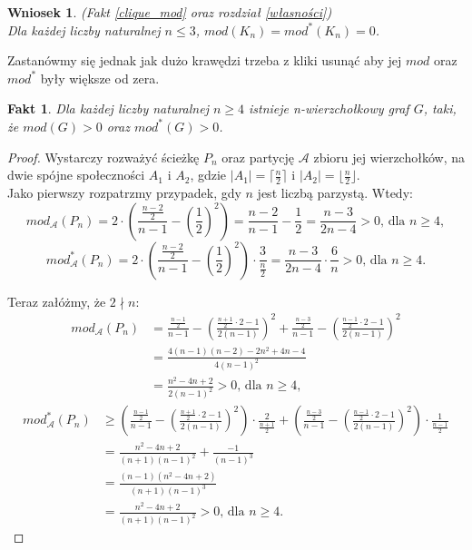 \documentclass[letterpaper,12pt]{article}
\newtheorem{fact}{Fakt}
\newtheorem{conclusion}{Wniosek}
\begin{document}
  \begin{conclusion}
    (Fakt \ref{clique_mod} oraz rozdział \ref{własności})\\
    Dla każdej liczby naturalnej \(n \leq 3\), \(mod(K_n) = mod^*(K_n) = 0\).\\
  \end{conclusion}

  Zastanówmy się jednak jak dużo krawędzi trzeba z kliki usunąć aby jej \(mod\) \cite{MS23} oraz \(mod^*\) były większe od zera.\\

  \begin{fact}
    Dla każdej liczby naturalnej \(n \geq 4\) istnieje n-wierzchołkowy graf \(G\), taki, że \(mod(G) > 0\) oraz \(mod^*(G) > 0\).\\
  \end{fact}
  \begin{proof}
    Wystarczy rozważyć ścieżkę \(P_n\) oraz partycję \(\mathcal{A}\) zbioru jej wierzchołków, na dwie spójne społeczności \(A_1\) i \(A_2\), gdzie \(|A_1| = \lceil\frac{n}{2}\rceil\) i \(|A_2| = \lfloor\frac{n}{2}\rfloor\).\\

    Jako pierwszy rozpatrzmy przypadek, gdy \(n\) jest liczbą parzystą. Wtedy:
    \[mod_{\mathcal{A}}(P_n) = 2\cdot\left(\frac{\frac{n-2}{2}}{n-1} - {\left(\frac{1}{2}\right)}^2\right) = \frac{n-2}{n-1}-\frac{1}{2}=\frac{n-3}{2n-4}>0 \text{, dla } n \geq 4,\]
    \[mod_{\mathcal{A}}^*(P_n) = 2\cdot\left(\frac{\frac{n-2}{2}}{n-1} - {\left(\frac{1}{2}\right)}^2\right) \cdot \frac{3}{\frac{n}{2}}=\frac{n-3}{2n-4} \cdot \frac{6}{n} > 0\text{, dla } n \geq 4.\]

    Teraz załóżmy, że \(2\nmid n\):
    \begin{align*}
      mod_{\mathcal{A}}(P_n) &= \frac{\frac{n-1}{2}}{n-1} - {\left(\frac{\frac{n+1}{2}\cdot 2-1}{2(n-1)}\right)}^2 + \frac{\frac{n-3}{2}}{n-1} - {\left(\frac{\frac{n-1}{2}\cdot 2-1}{2(n-1)}\right)}^2 \\
      &= \frac{4(n-1)(n-2)-2n^2+4n-4}{4(n-1)^2} \\
      &= \frac{n^2-4n+2}{2(n-1)^2}>0 \text{, dla } n \geq 4,
    \end{align*}
    \begin{align*}
      mod_{\mathcal{A}}^*(P_n) &\geq \left(\frac{\frac{n-1}{2}}{n-1} - {\left(\frac{\frac{n+1}{2}\cdot 2-1}{2(n-1)}\right)}^2\right) \cdot \frac{2}{\frac{n+1}{2}} + \left(\frac{\frac{n-3}{2}}{n-1} - {\left(\frac{\frac{n-1}{2}\cdot 2-1}{2(n-1)}\right)}^2\right) \cdot \frac{1}{\frac{n-1}{2}} \\
      &= \frac{n^2-4n+2}{(n+1)(n-1)^2} + \frac{-1}{(n-1)^3}\\
      &= \frac{(n-1)(n^2-4n+2)}{(n+1)(n-1)^3}\\
      &= \frac{n^2-4n+2}{(n+1)(n-1)^2}>0 \text{, dla } n \geq 4.
    \end{align*}
  \end{proof}
\end{document}
